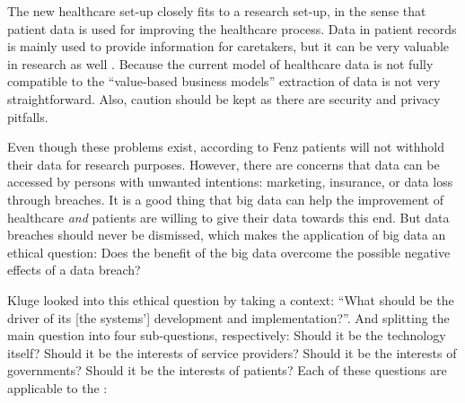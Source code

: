 The new healthcare set-up closely fits to a research set-up, in the sense that patient data is used for improving the healthcare process.
Data in patient records is mainly used to provide information for caretakers, but it can be very valuable in research as well \cite{s15Fenz2014}.
Because the current model of healthcare data is not fully compatible to the ``value-based business models'' extraction of data is not very straightforward.
Also, caution should be kept as there are security and privacy pitfalls.

Even though these problems exist, according to Fenz \cite{s15Fenz2014} patients will not withhold their data for research purposes.
However, there are concerns that data can be accessed by persons with unwanted intentions: marketing, insurance, or data loss through breaches.
It is a good thing that big data can help the improvement of healthcare \emph{and} patients are willing to give their data towards this end.
But data breaches should never be dismissed, which makes the application of big data an ethical question: Does the benefit of the big data overcome the possible negative effects of a data breach?

Kluge \cite{s7Kluge2007} looked into this ethical question by taking a context: ``What should be the driver of its [the systems'] development and implementation?''. 
And splitting the main question into four sub-questions, respectively: Should it be the technology itself? Should it be the interests of service providers? Should it be the interests of governments? Should it be the interests of patients?
Each of these questions are applicable to the \project{}:

